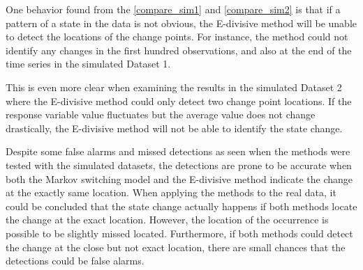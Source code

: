 One behavior found from the \ref{compare_sim1} and \ref{compare_sim2}
is that if a pattern of a state in the data is not obvious, the E-divisive
method will be unable to detect the locations of the change points.
For instance, the method could not identify any changes in the first
hundred observations, and also at the end of the time series in the
simulated Dataset 1. %
\begin{comment}
Besides, the duration that time series stays in one state also affects
the ability of the E-divisive method to discover the change point
locations. In the simulated Dataset 2, many switches between states
occur over the time period. As a result, the period of staying in
each state is short. 
\end{comment}
{} This is even more clear when examining the results in the simulated
Dataset 2 where the E-divisive method could only detect two change
point locations. If the response variable value fluctuates but the
average value does not change drastically, the E-divisive method will
not be able to identify the state change. %
\begin{comment}
To illustrate, the switching pattern is considerably difficult to
notice in the simulated Dataset 2. The period of staying in the state
is short and there are many switches between states occur over the
period of time. The shift for the response variable is not dramatic
that one can see the huge difference when there is a switch in the
state. Therefore, the E-divisive method could only detect two change
point locations where the shifts were obvious. 
\end{comment}

Despite some false alarms and missed detections as seen when the methods
were tested with the simulated datasets, the detections are prone
to be accurate when both the Markov switching model and the E-divisive
method indicate the change at the exactly same location. When applying
the methods to the real data, it could be concluded that the state
change actually happens if both methods locate the change at the exact
location. However, the location of the occurrence is possible to be
slightly missed located. Furthermore, if both methods could detect
the change at the close but not exact location, there are small chances
that the detections could be false alarms. %
\begin{comment}
these two methods appear to discover changes at around the same location
that the actual changes occur. This suggests that for the real data,
where the actual state is unknown, the actual changes might occur
around locations which were detected by these two methods. Despite
some false alarms and missed detections as seen when testing methods
with the simulated datasets, when applying both the Markov switching
model and the E-divisive method the to the real data if these two
methods can identify the change point at the exact same location,
then there is a high probability the the change is an actual change
of the state.
\end{comment}

